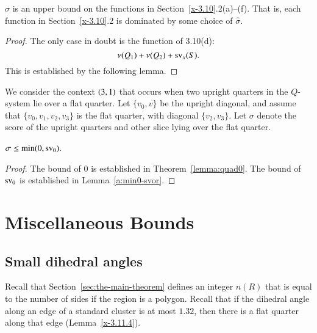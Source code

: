 \begin{lemma}
    \label{lemma:hatsigma}
$\hat\sigma$ is an upper bound on the functions in
Section~\ref{x-3.10}.2(a)--(f). That is, each function in
Section~\ref{x-3.10}.2 is dominated by some choice of $\hat\sigma$.
\end{lemma}

\begin{proof}  The only case in doubt is the function of 3.10(d):
$$\nu(Q_1)+\nu(Q_2)+{\operatorname{sv}}_x(S).$$ This is established by the
following lemma.
\end{proof}


We consider the context $\relax(3,1)$ that occurs when two upright
quarters in the $Q$-system lie over a flat quarter. Let $\{v_0,v\}$ be
the upright diagonal, and assume that $\{v_0,v_1,v_2,v_3\}$ is the
flat quarter, with diagonal $\{v_2,v_3\}$. Let $\sigma$ denote the
score of the upright quarters and other slice lying
over the flat quarter.

\begin{lemma}\label{lemma:min0-svor}
    $\sigma\le \min(0,{\operatorname{sv}}_0)$.
\end{lemma}

\begin{proof}
The bound of $0$ is established in Theorem~\ref{lemma:quad0}.
The bound of ${\operatorname{sv}}_0$ is established in Lemma~\ref{a:min0-svor}.
\end{proof}



    \label{sec:fb}




\section{Miscellaneous Bounds}
\subsection{Small dihedral angles} %
\label{sec:small-dih}

Recall that Section~\ref{sec:the-main-theorem} defines an integer $n(R)$
that is equal to the number of sides if the region is a polygon.  Recall
that if the dihedral angle along an edge of a standard cluster is at
most $1.32$, then there is a flat quarter along that edge
(Lemma~\ref{x-3.11.4}).

